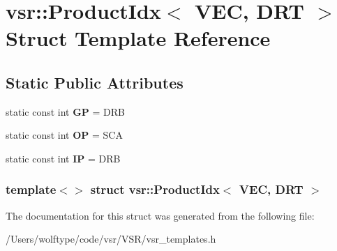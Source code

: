 \hypertarget{structvsr_1_1_product_idx_3_01_v_e_c_00_01_d_r_t_01_4}{\section{vsr\-:\-:Product\-Idx$<$ V\-E\-C, D\-R\-T $>$ Struct Template Reference}
\label{structvsr_1_1_product_idx_3_01_v_e_c_00_01_d_r_t_01_4}
}
\subsection*{Static Public Attributes}
\begin{DoxyCompactItemize}
\item 
\hypertarget{structvsr_1_1_product_idx_3_01_v_e_c_00_01_d_r_t_01_4_ada312b1f78cbe210058e6b648eff72d4}{static const int {\bfseries G\-P} = D\-R\-B}\label{structvsr_1_1_product_idx_3_01_v_e_c_00_01_d_r_t_01_4_ada312b1f78cbe210058e6b648eff72d4}

\item 
\hypertarget{structvsr_1_1_product_idx_3_01_v_e_c_00_01_d_r_t_01_4_ae153fcc2876735fbce934fecc1a85c4f}{static const int {\bfseries O\-P} = S\-C\-A}\label{structvsr_1_1_product_idx_3_01_v_e_c_00_01_d_r_t_01_4_ae153fcc2876735fbce934fecc1a85c4f}

\item 
\hypertarget{structvsr_1_1_product_idx_3_01_v_e_c_00_01_d_r_t_01_4_a29b12584f981fbcbf7642984af0a5938}{static const int {\bfseries I\-P} = D\-R\-B}\label{structvsr_1_1_product_idx_3_01_v_e_c_00_01_d_r_t_01_4_a29b12584f981fbcbf7642984af0a5938}

\end{DoxyCompactItemize}
\subsubsection*{template$<$$>$ struct vsr\-::\-Product\-Idx$<$ V\-E\-C, D\-R\-T $>$}



The documentation for this struct was generated from the following file\-:\begin{DoxyCompactItemize}
\item 
/\-Users/wolftype/code/vsr/\-V\-S\-R/vsr\-\_\-templates.\-h\end{DoxyCompactItemize}
